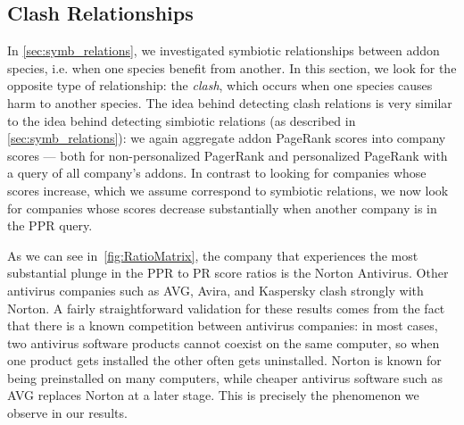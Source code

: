 \documentclass[11pt,oneside]{book}
\let\Oldsubsection\subsection
\renewcommand{\subsection}{\FloatBarrier\Oldsubsection}
\begin{document}






\subsection{Clash Relationships}
\label{sec:clash_relations}

In \autoref{sec:symb_relations}, we investigated symbiotic relationships between addon species, i.e. when one species benefit from another. In this section, we look for the opposite type of relationship: the \emph{clash}, which occurs when one species causes harm to another species. The idea behind detecting clash relations is very similar to the idea behind detecting simbiotic relations (as described in \autoref{sec:symb_relations}): we again aggregate addon PageRank scores into company scores --- both for non-personalized PagerRank and personalized PageRank with a query of all company's addons. In contrast to looking for companies whose scores increase, which we assume correspond to symbiotic relations, we now look for companies whose scores decrease substantially when another company is in the PPR query. 

As we can see in~\autoref{fig:RatioMatrix}, the company that experiences the most substantial plunge in the PPR to PR score ratios is the Norton Antivirus. Other antivirus companies such as AVG, Avira, and Kaspersky clash strongly with Norton. A fairly straightforward validation for these results comes from the fact that there is a known competition between antivirus companies: in most cases, two antivirus software products cannot coexist on the same computer, so when one product gets installed the other often gets uninstalled. Norton is known for being preinstalled on many computers, while cheaper antivirus software such as AVG replaces Norton at a later stage. This is precisely the phenomenon we observe in our results.
\end{document}
